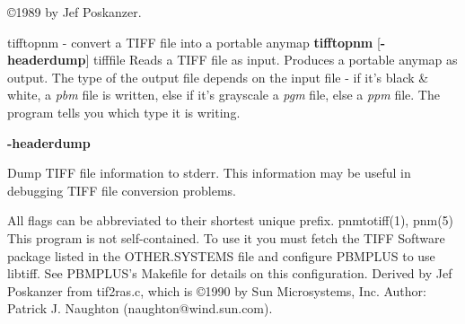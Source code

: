 \copyright 1989 by Jef Poskanzer.
%
 
%

\newpage
%

tifftopnm - convert a TIFF file into a portable anymap
{\bf tifftopnm}
{\rm [}{\bf -headerdump}{\rm ]}
{\rm tifffile}
Reads a TIFF file as input.
Produces a portable anymap as output.
The type of the output file depends on the input file - if it's
black \& white, a
{\it pbm}
file is written, else if it's grayscale a
{\it pgm}
file, else a
{\it ppm}
file.  The program tells you which type it is writing.
\begin{TPlist}{{\bf -headerdump}}
\item[{{\bf -headerdump}}]
Dump TIFF file information to stderr.  This information may be useful 
in debugging TIFF file conversion problems.  
\end{TPlist}

\par
All flags can be abbreviated to their shortest unique prefix.
pnmtotiff(1), pnm(5)
This program is not self-contained.  To use it you must fetch the
TIFF Software package listed in the OTHER.SYSTEMS file and configure
PBMPLUS to use libtiff.  See PBMPLUS's Makefile for details on this
configuration.
Derived by Jef Poskanzer from tif2ras.c, which is
\copyright 1990 by Sun Microsystems, Inc.\hfil\break
Author: Patrick J. Naughton (naughton@wind.sun.com).
% 
%
 
